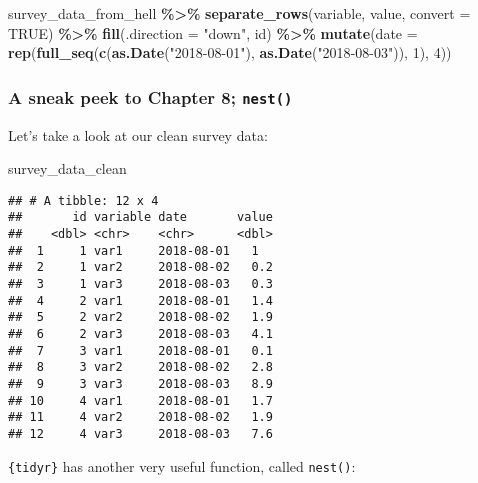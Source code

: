 \documentclass[
]{article}
\newenvironment{Shaded}{\begin{snugshade}}{\end{snugshade}}
\newcommand{\DataTypeTok}[1]{\textcolor[rgb]{0.13,0.29,0.53}{#1}}
\newcommand{\DecValTok}[1]{\textcolor[rgb]{0.00,0.00,0.81}{#1}}
\newcommand{\KeywordTok}[1]{\textcolor[rgb]{0.13,0.29,0.53}{\textbf{#1}}}
\newcommand{\NormalTok}[1]{#1}
\newcommand{\OperatorTok}[1]{\textcolor[rgb]{0.81,0.36,0.00}{\textbf{#1}}}
\newcommand{\OtherTok}[1]{\textcolor[rgb]{0.56,0.35,0.01}{#1}}
\newcommand{\StringTok}[1]{\textcolor[rgb]{0.31,0.60,0.02}{#1}}
\begin{document}
\begin{Shaded}
\begin{Highlighting}[]
\NormalTok{survey\_data\_from\_hell }\OperatorTok{\%\textgreater{}\%}
\StringTok{    }\KeywordTok{separate\_rows}\NormalTok{(variable, value, }\DataTypeTok{convert =} \OtherTok{TRUE}\NormalTok{) }\OperatorTok{\%\textgreater{}\%}
\StringTok{    }\KeywordTok{fill}\NormalTok{(}\DataTypeTok{.direction =} \StringTok{"down"}\NormalTok{, id) }\OperatorTok{\%\textgreater{}\%}
\StringTok{    }\KeywordTok{mutate}\NormalTok{(}\DataTypeTok{date =} \KeywordTok{rep}\NormalTok{(}\KeywordTok{full\_seq}\NormalTok{(}\KeywordTok{c}\NormalTok{(}\KeywordTok{as.Date}\NormalTok{(}\StringTok{"2018{-}08{-}01"}\NormalTok{), }\KeywordTok{as.Date}\NormalTok{(}\StringTok{"2018{-}08{-}03"}\NormalTok{)), }\DecValTok{1}\NormalTok{), }\DecValTok{4}\NormalTok{))}
\end{Highlighting}
\end{Shaded}

\hypertarget{a-sneak-peek-to-chapter-8-nest}{%
\subsubsection{\texorpdfstring{A sneak peek to Chapter 8; \texttt{nest()}}{A sneak peek to Chapter 8; nest()}}\label{a-sneak-peek-to-chapter-8-nest}}

Let's take a look at our clean survey data:

\begin{Shaded}
\begin{Highlighting}[]
\NormalTok{survey\_data\_clean}
\end{Highlighting}
\end{Shaded}

\begin{verbatim}
## # A tibble: 12 x 4
##       id variable date       value
##    <dbl> <chr>    <chr>      <dbl>
##  1     1 var1     2018-08-01   1  
##  2     1 var2     2018-08-02   0.2
##  3     1 var3     2018-08-03   0.3
##  4     2 var1     2018-08-01   1.4
##  5     2 var2     2018-08-02   1.9
##  6     2 var3     2018-08-03   4.1
##  7     3 var1     2018-08-01   0.1
##  8     3 var2     2018-08-02   2.8
##  9     3 var3     2018-08-03   8.9
## 10     4 var1     2018-08-01   1.7
## 11     4 var2     2018-08-02   1.9
## 12     4 var3     2018-08-03   7.6
\end{verbatim}

\texttt{\{tidyr\}} has another very useful function, called \texttt{nest()}:
\end{document}
